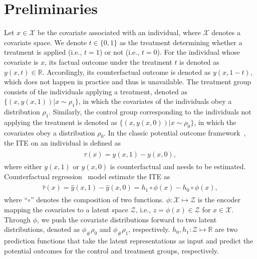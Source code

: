 \documentclass{article}
\begin{document}
\section{Preliminaries}\label{preli-causal}
Let $x\in\mathcal{X}$ be the covariate associated with an individual, where $\mathcal{X}$ denotes a covariate space.
We denote $t\in\{0,1\}$ as the treatment determining whether a treatment is applied (i.e., $t=1$) or not (i.e., $t=0$). 
For the individual whose covariate is $x$, its factual outcome under the treatment $t$ is denoted as $y(x,t)\in\mathbb{R}$. 
Accordingly, its counterfactual outcome is denoted as $y(x,1-t)$, which does not happen in practice and thus is unavailable.
The treatment group consists of the individuals applying a treatment, denoted as $\{(x,y(x,1))|x\sim\rho_1\}$, in which the covariates of the individuals obey a distribution $\rho_1$. 
Similarly, the control group corresponding to the individuals not applying the treatment is denoted as $\{(x,y(x,0))|x\sim\rho_0\}$, in which the covariates obey a distribution $\rho_0$. 
In the classic potential outcome framework~\cite{rubin1974estimating,splawa1990application}, the ITE on an individual is defined as
\begin{eqnarray}\label{eq:ite}
    \begin{aligned}
        \tau(x) = y(x,1) - y(x,0),
    \end{aligned}
\end{eqnarray}
where either $y(x,1)$ or $y(x,0)$ is counterfactual and needs to be estimated. 
Counterfactual regression~\cite{shalit2017estimating} model estimate the ITE as 
\begin{eqnarray}\label{eq:pred_ite}
    \begin{aligned}
        \hat{\tau}(x) = \hat{y}(x,1) - \hat{y}(x,0) = h_1\circ \phi(x) - h_0\circ\phi(x),
    \end{aligned}
\end{eqnarray}
where ``$\circ$'' denotes the composition of two functions. $\phi:\mathcal{X}\mapsto\mathcal{Z}$ is the encoder mapping the covariates to a latent space $\mathcal{Z}$, i.e., $z=\phi(x)\in\mathcal{Z}$ for $x\in\mathcal{X}$.
Through $\phi$, we push the covariate distributions forward to two latent distributions, denoted as $\phi_{\#}\rho_0$ and $\phi_{\#}\rho_1$, respectively.
$h_0, h_1: \mathcal{Z} \mapsto \mathbb{R}$ are two prediction functions that take the latent representations as input and predict the potential outcomes for the control and treatment groups, respectively.
\end{document}
